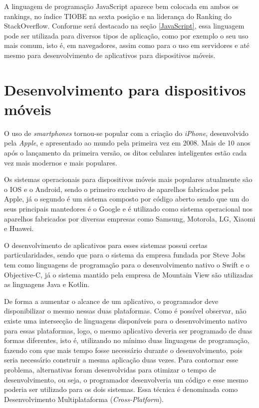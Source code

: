 A linguagem de programação JavaScript aparece bem colocada em ambos os rankings, no índice TIOBE na sexta posição e na liderança do Ranking do StackOverflow. Conforme será destacado na seção \ref{JavaScript}, essa linguagem pode ser utilizada para diversos tipos de aplicação, como por exemplo o seu uso mais comum, isto é, em navegadores, assim como para o uso em servidores e até mesmo para desenvolvimento de aplicativos para dispositivos móveis.

\section{Desenvolvimento para dispositivos móveis}
\label{sec-desenvolvimento-apps}

O uso de \textit{smartphones} tornou-se popular com a criação do \textit{iPhone}, desenvolvido pela \textit{Apple}, e apresentado ao mundo pela primeira vez em 2008. Mais de 10 anos após o lançamento da primeira versão, os ditos celulares inteligentes estão cada vez mais modernos e mais populares.


Os sistemas operacionais para dispositivos móveis mais populares atualmente são o IOS e o Android, sendo o primeiro exclusivo de aparelhos fabricados pela Apple, já o segundo é um sistema composto por código aberto sendo que um do seus principais mantedores é o Google e é utilizado como sistema operacional nos aparelhos fabricados por diversas empresas como Samsung, Motorola, LG, Xiaomi e Huawei.

O desenvolvimento de aplicativos para esses sistemas possui certas particularidades, sendo que para o sistema da empresa fundada por Steve Jobs tem como linguagens de programação para o desenvolvimento nativo o Swift e o Objective-C, já o sistema mantido pela empresa de Mountain View são utilizadas as linguagens Java e Kotlin.

De forma a aumentar o alcance de um aplicativo, o programador deve disponibilizar o mesmo nessas duas plataformas. Como é possível observar, não existe uma intersecção de linguagens disponíveis para o desenvolvimento nativo para essas plataformas, logo, o mesmo aplicativo deveria ser programado de duas formas diferentes, isto é, utilizando no mínimo duas linguagens de programação, fazendo com que mais tempo fosse necessário durante o desenvolvimento, pois seria necessário construir a mesma aplicação duas vezes. Para contornar esse problema, alternativas foram desenvolvidas para otimizar o tempo de desenvolvimento, ou seja, o programador desenvolveria um código e esse mesmo poderia ser utilizado para os dois sistemas. Essa técnica é denominada como Desenvolvimento Multiplataforma (\textit{Cross-Platform}).

